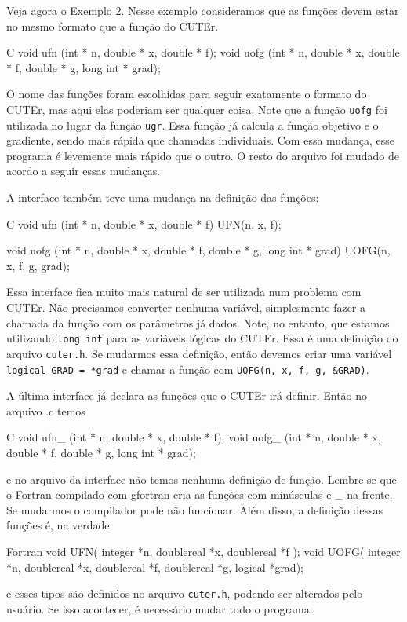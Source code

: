 \documentclass[letterpaper,11pt]{article}
\numberwithin{equation}{section}
\begin{document}
Veja agora o Exemplo 2. Nesse exemplo consideramos que as funções devem estar no mesmo
formato que a função do CUTEr.
\begin{code}{C}
void ufn (int * n, double * x, double * f);
void uofg (int * n, double * x, double * f, double * g, long int * grad);
\end{code}
O nome das funções foram escolhidas para seguir exatamente o formato do CUTEr, mas aqui
elas poderiam ser qualquer coisa. Note que a função \verb+uofg+ foi utilizada no lugar
da função \verb+ugr+. Essa função já calcula a função objetivo e o gradiente, sendo mais
rápida que chamadas individuais. Com essa mudança, esse programa é levemente mais rápido
que o outro. O resto do arquivo foi mudado de acordo a seguir essas mudanças.

A interface também teve uma mudança na definição das funções:
\begin{code}{C}
void ufn (int * n, double * x, double * f) {
  UFN(n, x, f);
}

void uofg (int * n, double * x, double * f, double * g, long int * grad) {
  UOFG(n, x, f, g, grad);
}
\end{code}
Essa interface fica muito mais natural de ser utilizada num problema com CUTEr. Não precisamos
converter nenhuma variável, simplesmente fazer a chamada da função com os parâmetros já dados.
Note, no entanto, que estamos utilizando \verb+long int+ para as variáveis lógicas do CUTEr.
Essa é uma definição do arquivo \verb+cuter.h+. Se mudarmos essa definição, então devemos
criar uma variável \verb+logical GRAD = *grad+ e chamar a função com
\verb+UOFG(n, x, f, g, &GRAD)+.

A última interface já declara as funções que o CUTEr irá definir. Então no arquivo .c temos
\begin{code}{C}
void ufn_ (int * n, double * x, double * f);
void uofg_ (int * n, double * x, double * f, double * g, long int * grad);
\end{code}
e no arquivo da interface não temos nenhuma definição de função. Lembre-se que o Fortran
compilado com gfortran cria as funções com minúsculas e \_ na frente. Se mudarmos o
compilador pode não funcionar. 
Além disso, a definição dessas funções é, na verdade
\begin{code}{Fortran}
void UFN( integer *n, doublereal *x, doublereal *f );
void UOFG( integer *n, doublereal *x, doublereal *f, doublereal *g,
      logical *grad);
\end{code}
e esses tipos são definidos no arquivo \verb+cuter.h+, podendo ser alterados pelo usuário.
Se isso acontecer, é necessário mudar todo o programa.
\end{document}
